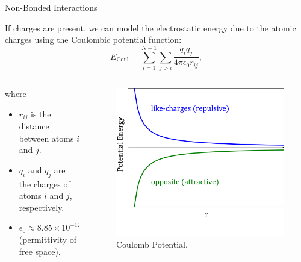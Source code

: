 \documentclass[aspectratio=169]{beamer}
\begin{document}
\begin{frame}[fragile]{Non-Bonded Interactions}

If charges are present, we can model the electrostatic energy due to the atomic charges using the Coulombic potential function:
%
\begin{equation}
	E_{\text{Coul}} = \sum_{i=1}^{N-1} \sum_{j>i} \frac{q_i q_j}{4\pi\epsilon_0r_{ij}},
\end{equation}
%
%
\begin{columns}
\begin{column}{0.5\textwidth}
	where
	\begin{itemize}
		\item $r_{ij}$ is the distance between atoms $i$ and $j$.
		\item $q_i$ and $q_j$ are the charges of atoms $i$ and $j$, respectively.
		\item $\epsilon_0 \approx 8.85 × 10^{-12} m^{-3} kg^{-1} s^4 A^2$ (permittivity of free space).
	\end{itemize}
\end{column}
%
\begin{column}{0.5\textwidth} 
	\begin{figure}
		\includegraphics[scale=0.225]{Graphics/coulomb.png}
		\caption{Coulomb Potential.}
	\end{figure}
\end{column}
\end{columns}
%

\end{frame}
\end{document}
